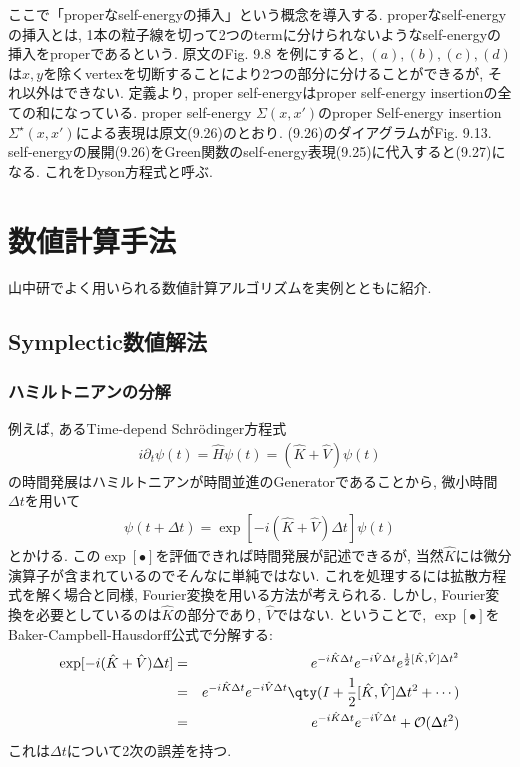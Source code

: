 \documentclass[10.5pt,a4paper]{jreport}
\begin{document}
ここで「properなself-energyの挿入」という概念を導入する. properなself-energyの挿入とは, 1本の粒子線を切って2つのtermに分けられないようなself-energyの挿入をproperであるという. 原文のFig. 9.8 を例にすると, $(a), (b), (c), (d)$は$x, y$を除くvertexを切断することにより2つの部分に分けることができるが, それ以外はできない. 定義より, proper self-energyはproper self-energy insertionの全ての和になっている. proper self-energy $\Sigma(x, x')$のproper Self-energy insertion $\Sigma^\star(x, x')$による表現は原文(9.26)のとおり. (9.26)のダイアグラムがFig. 9.13. self-energyの展開(9.26)をGreen関数のself-energy表現(9.25)に代入すると(9.27)になる. これをDyson方程式と呼ぶ.
\newpage
\chapter{数値計算手法}
山中研でよく用いられる数値計算アルゴリズムを実例とともに紹介. 
\section{Symplectic数値解法}
\subsection{ハミルトニアンの分解}
例えば, あるTime-depend Schr\"odinger方程式
\begin{eqnarray}
  i\partial_t\psi(t) = \hat{H}\psi(t) = (\hat{K} + \hat{V})\psi(t)
\end{eqnarray}
の時間発展はハミルトニアンが時間並進のGeneratorであることから, 微小時間$\Delta t$を用いて
\begin{eqnarray}
  \psi(t + \Delta t)  = \exp[-i(\hat{K} + \hat{V})\Delta t]\psi(t)
\end{eqnarray}
とかける. この$\exp[\bullet]$を評価できれば時間発展が記述できるが, 当然$\hat{K}$には微分演算子が含まれているのでそんなに単純ではない. これを処理するには拡散方程式を解く場合と同様, Fourier変換を用いる方法が考えられる. しかし, Fourier変換を必要としているのは$\hat{K}$の部分であり, $\hat{V}$ではない. ということで, $\exp[\bullet]$をBaker-Campbell-Hausdorff公式で分解する:
\begin{eqnarray}
  \exp[-i(\hat{K} + \hat{V})\Delta t] &=& e^{-i\hat{K}\Delta t}e^{-i\hat{V}\Delta t}e^{\frac{1}{2}[\hat{K}, \hat{V}]\Delta t^2}\\
  &=& e^{-i\hat{K}\Delta t}e^{-i\hat{V}\Delta t}\qty(I + \frac{1}{2}[\hat{K}, \hat{V}]\Delta t^2 + \cdots)\\
  &=& e^{-i\hat{K}\Delta t}e^{-i\hat{V}\Delta t} + {\cal O}(\Delta t^2)
\end{eqnarray}
これは$\Delta t$について2次の誤差を持つ.
\end{document}
